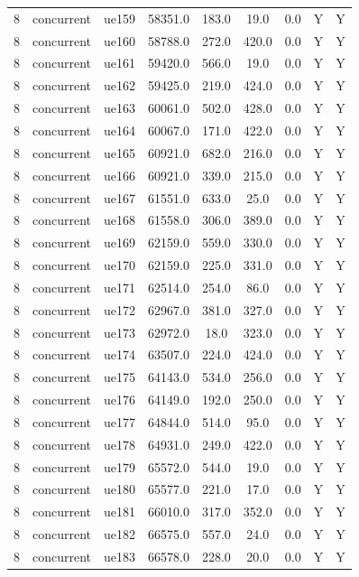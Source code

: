 \begin{table}[ht]
\begin{tabular}{|c|c|c|c|c|c|c|c|c|}
8 & concurrent & ue159 & 58351.0 & 183.0 & 19.0 & 0.0 & Y & Y \\
8 & concurrent & ue160 & 58788.0 & 272.0 & 420.0 & 0.0 & Y & Y \\
8 & concurrent & ue161 & 59420.0 & 566.0 & 19.0 & 0.0 & Y & Y \\
8 & concurrent & ue162 & 59425.0 & 219.0 & 424.0 & 0.0 & Y & Y \\
8 & concurrent & ue163 & 60061.0 & 502.0 & 428.0 & 0.0 & Y & Y \\
8 & concurrent & ue164 & 60067.0 & 171.0 & 422.0 & 0.0 & Y & Y \\
8 & concurrent & ue165 & 60921.0 & 682.0 & 216.0 & 0.0 & Y & Y \\
8 & concurrent & ue166 & 60921.0 & 339.0 & 215.0 & 0.0 & Y & Y \\
8 & concurrent & ue167 & 61551.0 & 633.0 & 25.0 & 0.0 & Y & Y \\
8 & concurrent & ue168 & 61558.0 & 306.0 & 389.0 & 0.0 & Y & Y \\
8 & concurrent & ue169 & 62159.0 & 559.0 & 330.0 & 0.0 & Y & Y \\
8 & concurrent & ue170 & 62159.0 & 225.0 & 331.0 & 0.0 & Y & Y \\
8 & concurrent & ue171 & 62514.0 & 254.0 & 86.0 & 0.0 & Y & Y \\
8 & concurrent & ue172 & 62967.0 & 381.0 & 327.0 & 0.0 & Y & Y \\
8 & concurrent & ue173 & 62972.0 & 18.0 & 323.0 & 0.0 & Y & Y \\
8 & concurrent & ue174 & 63507.0 & 224.0 & 424.0 & 0.0 & Y & Y \\
8 & concurrent & ue175 & 64143.0 & 534.0 & 256.0 & 0.0 & Y & Y \\
8 & concurrent & ue176 & 64149.0 & 192.0 & 250.0 & 0.0 & Y & Y \\
8 & concurrent & ue177 & 64844.0 & 514.0 & 95.0 & 0.0 & Y & Y \\
8 & concurrent & ue178 & 64931.0 & 249.0 & 422.0 & 0.0 & Y & Y \\
8 & concurrent & ue179 & 65572.0 & 544.0 & 19.0 & 0.0 & Y & Y \\
8 & concurrent & ue180 & 65577.0 & 221.0 & 17.0 & 0.0 & Y & Y \\
8 & concurrent & ue181 & 66010.0 & 317.0 & 352.0 & 0.0 & Y & Y \\
8 & concurrent & ue182 & 66575.0 & 557.0 & 24.0 & 0.0 & Y & Y \\
8 & concurrent & ue183 & 66578.0 & 228.0 & 20.0 & 0.0 & Y & Y \\

\end{tabular}
\end{table}
